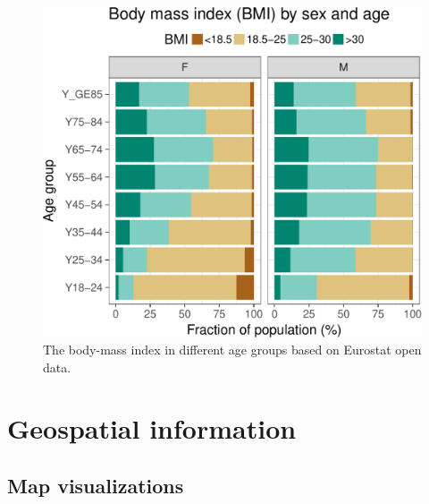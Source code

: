 \begin{figure}
\begin{center}
\includegraphics{2015-manu-bmi-1}
\end{center}
\caption{The body-mass index in different age groups based on Eurostat open data.}
\label{fig:bmi}
\end{figure}



\section{Geospatial information}

\subsection{Map visualizations}

